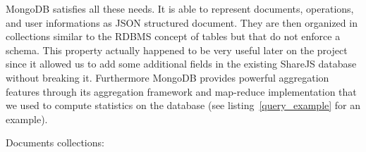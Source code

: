 \documentclass{llncs}
\begin{document}
MongoDB satisfies all these needs. It is able to represent documents, operations,
and user informations as JSON structured document. They are then organized in
collections similar to the RDBMS concept of tables but that do not enforce a schema.
This property actually happened to be very useful later on the project since it
allowed us to add some additional fields in the existing ShareJS database without
breaking it. Furthermore MongoDB provides powerful aggregation features through
its aggregation framework and map-reduce implementation that we used to compute
statistics on the database (see listing~\ref{query_example} for an example).


Documents collections:
%
\end{document}

